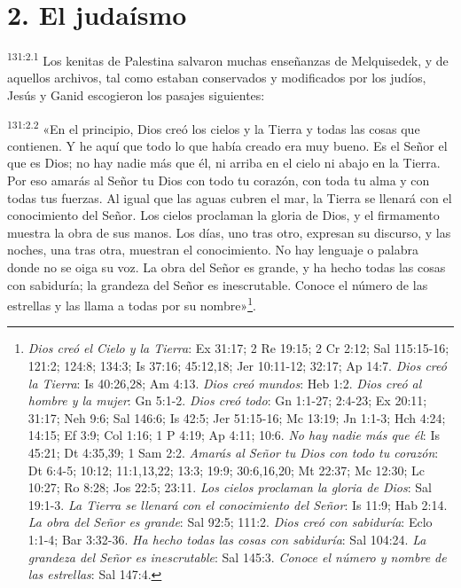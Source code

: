 \section*{2. El judaísmo}
\par 
\textsuperscript{131:2.1} Los kenitas de Palestina salvaron muchas enseñanzas de Melquisedek, y de aquellos archivos, tal como estaban conservados y modificados por los judíos, Jesús y Ganid escogieron los pasajes siguientes:

\par 
\textsuperscript{131:2.2} «En el principio, Dios creó los cielos y la Tierra y todas las cosas que contienen. Y he aquí que todo lo que había creado era muy bueno. Es el Señor el que es Dios; no hay nadie más que él, ni arriba en el cielo ni abajo en la Tierra. Por eso amarás al Señor tu Dios con todo tu corazón, con toda tu alma y con todas tus fuerzas. Al igual que las aguas cubren el mar, la Tierra se llenará con el conocimiento del Señor. Los cielos proclaman la gloria de Dios, y el firmamento muestra la obra de sus manos. Los días, uno tras otro, expresan su discurso, y las noches, una tras otra, muestran el conocimiento. No hay lenguaje o palabra donde no se oiga su voz. La obra del Señor es grande, y ha hecho todas las cosas con sabiduría; la grandeza del Señor es inescrutable. Conoce el número de las estrellas y las llama a todas por su nombre»\footnote{\textit{Dios creó el Cielo y la Tierra}: Ex 31:17; 2 Re 19:15; 2 Cr 2:12; Sal 115:15-16; 121:2; 124:8; 134:3; Is 37:16; 45:12,18; Jer 10:11-12; 32:17; Ap 14:7. \textit{Dios creó la Tierra}: Is 40:26,28; Am 4:13. \textit{Dios creó mundos}: Heb 1:2. \textit{Dios creó al hombre y la mujer}: Gn 5:1-2. \textit{Dios creó todo}: Gn 1:1-27; 2:4-23; Ex 20:11; 31:17; Neh 9:6; Sal 146:6; Is 42:5; Jer 51:15-16; Mc 13:19; Jn 1:1-3; Hch 4:24; 14:15; Ef 3:9; Col 1:16; 1 P 4:19; Ap 4:11; 10:6. \textit{No hay nadie más que él}: Is 45:21; Dt 4:35,39; 1 Sam 2:2. \textit{Amarás al Señor tu Dios con todo tu corazón}: Dt 6:4-5; 10:12; 11:1,13,22; 13:3; 19:9; 30:6,16,20; Mt 22:37; Mc 12:30; Lc 10:27; Ro 8:28; Jos 22:5; 23:11. \textit{Los cielos proclaman la gloria de Dios}: Sal 19:1-3. \textit{La Tierra se llenará con el conocimiento del Señor}: Is 11:9; Hab 2:14. \textit{La obra del Señor es grande}: Sal 92:5; 111:2. \textit{Dios creó con sabiduría}: Eclo 1:1-4; Bar 3:32-36. \textit{Ha hecho todas las cosas con sabiduría}: Sal 104:24. \textit{La grandeza del Señor es inescrutable}: Sal 145:3. \textit{Conoce el número y nombre de las estrellas}: Sal 147:4.}.

